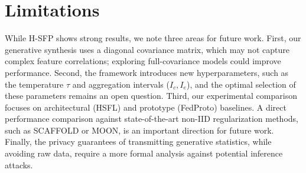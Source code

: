 \section{Limitations}
    While H-SFP shows strong results, we note three areas for future work. First, our generative synthesis uses a diagonal covariance matrix, which may not capture complex feature correlations; exploring full-covariance models could improve performance. Second, the framework introduces new hyperparameters, such as the temperature $\tau$ and aggregation intervals ($I_c, I_e$), and the optimal selection of these parameters remains an open question. Third, our experimental comparison focuses on architectural (HSFL) and prototype (FedProto) baselines. A direct performance comparison against state-of-the-art non-IID regularization methods, such as SCAFFOLD or MOON, is an important direction for future work. Finally, the privacy guarantees of transmitting generative statistics, while avoiding raw data, require a more formal analysis against potential inference attacks.